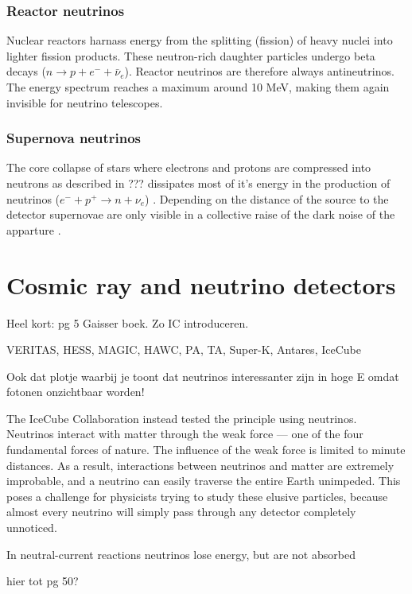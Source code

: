 \subsubsection{Reactor neutrinos}
Nuclear reactors harnass energy from the splitting (fission) of heavy nuclei into lighter fission products. These neutron-rich daughter particles undergo beta decays ($n \rightarrow p+e^-+\bar{\nu}_e$). Reactor neutrinos are therefore always antineutrinos. The energy spectrum reaches a maximum around 10 MeV, making them again invisible for neutrino telescopes. 

\subsubsection{Supernova neutrinos}
The core collapse of stars where electrons and protons are compressed into neutrons as described in ??? dissipates most of it's energy in the production of neutrinos ($e^- + p^+ \rightarrow n + \nu_e$) \cite{Scholberg:2012id}. Depending on the distance of the source to the detector supernovae are only visible in a collective raise of the dark noise of the apparture \cite{Kopke:2011xb}.
\section{Cosmic ray and neutrino detectors}
\label{sec:detectors}

Heel kort: pg 5 Gaisser boek. Zo IC introduceren.

VERITAS, HESS, MAGIC, HAWC, PA, TA, Super-K, Antares, IceCube

Ook dat plotje waarbij je toont dat neutrinos interessanter zijn in hoge E omdat fotonen onzichtbaar worden!

The IceCube Collaboration instead tested the principle using neutrinos. Neutrinos interact with matter through the weak force — one of the four fundamental forces of nature. The influence of the weak force is limited to minute distances. As a result, interactions between neutrinos and matter are extremely improbable, and a neutrino can easily traverse the entire Earth unimpeded. This poses a challenge for physicists trying to study these elusive particles, because almost every neutrino will simply pass through any detector completely unnoticed.




In neutral-current reactions neutrinos lose energy, but are not absorbed

hier tot pg 50?